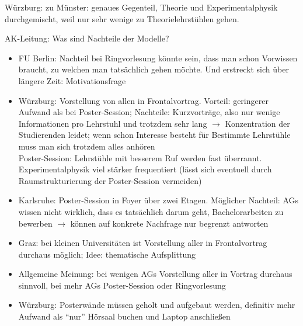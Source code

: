     Würzburg: zu Münster: genaues Gegenteil, Theorie und Experimentalphysik durchgemischt, weil nur sehr wenige zu Theorielehrstühlen gehen.

    AK-Leitung: Was sind Nachteile der Modelle?
    \begin{itemize}
      \item FU Berlin: Nachteil bei Ringvorlesung könnte sein, dass man schon Vorwissen braucht, zu welchen man tatsächlich gehen möchte. Und erstreckt sich über längere Zeit: Motivationsfrage
      \item Würzburg: Vorstellung von allen in Frontalvortrag. Vorteil: geringerer Aufwand als bei Poster-Session; Nachteile: Kurzvorträge, also nur wenige Informationen pro Lehrstuhl und trotzdem sehr lang $\rightarrow$ Konzentration der Studierenden leidet; wenn schon Interesse besteht für Bestimmte Lehrstühle muss man sich trotzdem alles anhören \\
      Poster-Session: Lehrstühle mit besserem Ruf werden fast überrannt. Experimentalphysik viel stärker frequentiert (lässt sich eventuell durch Raumstrukturierung der Poster-Session vermeiden)
      \item Karlsruhe: Poster-Session in Foyer über zwei Etagen. Möglicher Nachteil: AGs wissen nicht wirklich, dass es tatsächlich darum geht, Bachelorarbeiten zu bewerben $\rightarrow$ können auf konkrete Nachfrage nur begrenzt antworten
      \item Graz: bei kleinen Universitäten ist Vorstellung aller in Frontalvortrag durchaus möglich; Idee: thematische Aufsplittung
      \item Allgemeine Meinung: bei wenigen AGs Vorstellung aller in Vortrag durchaus sinnvoll, bei mehr AGs Poster-Session oder Ringvorlesung
      \item Würzburg: Posterwände müssen geholt und aufgebaut werden, definitiv mehr Aufwand als ``nur'' Hörsaal buchen und Laptop anschließen

    \end{itemize}

